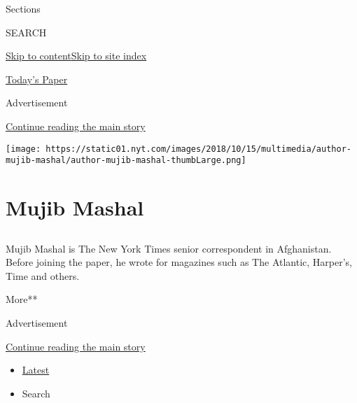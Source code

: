 Sections

SEARCH

\protect\hyperlink{site-content}{Skip to
content}\protect\hyperlink{site-index}{Skip to site index}

\href{https://myaccount.nytimes.com/auth/login?response_type=cookie\&client_id=vi}{}

\href{https://www.nytimes.com/section/todayspaper}{Today's Paper}

Advertisement

\protect\hyperlink{after-top}{Continue reading the main story}

\texttt{[image: https://static01.nyt.com/images/2018/10/15/multimedia/author-mujib-mashal/author-mujib-mashal-thumbLarge.png]}

\hypertarget{mujib-mashal}{%
\section{Mujib Mashal}\label{mujib-mashal}}

\subsection{}

Mujib Mashal is The New York Times senior correspondent in Afghanistan.
Before joining the paper, he wrote for magazines such as The Atlantic,
Harper's, Time and others.

More**

Advertisement

\protect\hyperlink{after-mid1}{Continue reading the main story}

\begin{itemize}
\tightlist
\item
  \protect\hyperlink{stream-panel}{Latest}
\item
  Search
\end{itemize}

